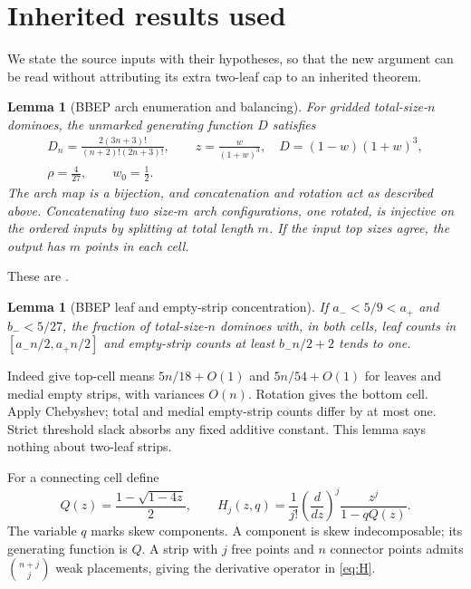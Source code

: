 \documentclass[11pt]{amsart}
\numberwithin{equation}{section}
\newtheorem{lemma}[theorem]{Lemma}
\theoremstyle{remark}\newtheorem{remark}[theorem]{Remark}
\begin{document}
\section{Inherited results used}
We state the source inputs with their hypotheses, so that the new argument can be read without attributing its extra two-leaf cap to an inherited theorem.

\begin{lemma}[BBEP arch enumeration and balancing]\label{lem:bbep}
For gridded total-size-$n$ dominoes, the unmarked generating function $D$ satisfies
\begin{gather}\label{eq:curve}
 D_n=\frac{2(3n+3)!}{(n+2)!(2n+3)!},\qquad
 z=\frac{w}{(1+w)^3},\quad D=(1-w)(1+w)^3,\\
 \rho=\frac4{27},\qquad w_0=\frac12.\nonumber
\end{gather}
The arch map is a bijection, and concatenation and rotation act as described above. Concatenating two size-$m$ arch configurations, one rotated, is injective on the ordered inputs by splitting at total length $m$. If the input top sizes agree, the output has $m$ points in each cell.
\end{lemma}
These are \cite[Theorem 3.1, Propositions 3.2--3.4 and 3.6]{BBEP}.

\begin{lemma}[BBEP leaf and empty-strip concentration]\label{lem:concentration}
If $a_-<5/9<a_+$ and $b_-<5/27$, the fraction of total-size-$n$ dominoes with, in both cells, leaf counts in $[a_-n/2,a_+n/2]$ and empty-strip counts at least $b_-n/2+2$ tends to one.
\end{lemma}
Indeed \cite[Propositions 6.1--6.4]{BBEP} give top-cell means $5n/18+O(1)$ and $5n/54+O(1)$ for leaves and medial empty strips, with variances $O(n)$. Rotation gives the bottom cell. Apply Chebyshev; total and medial empty-strip counts differ by at most one. Strict threshold slack absorbs any fixed additive constant. This lemma says nothing about two-leaf strips.

For a connecting cell define
\begin{equation}\label{eq:H}
 Q(z)=\frac{1-\sqrt{1-4z}}2,\qquad
 H_j(z,q)=\frac1{j!}\left(\frac{d}{dz}\right)^j
                  \frac{z^j}{1-qQ(z)}.
\end{equation}
The variable $q$ marks skew components. A component is skew indecomposable; its generating function is $Q$. A strip with $j$ free points and $n$ connector points admits $\binom{n+j}{j}$ weak placements, giving the derivative operator in \eqref{eq:H}.
\end{document}
